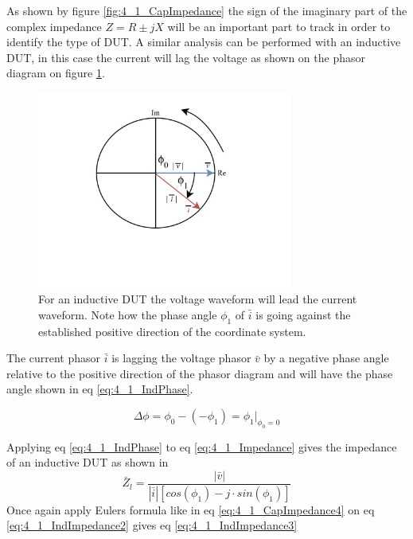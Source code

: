 As shown by figure \ref{fig:4_1_CapImpedance} the sign of the imaginary part of the complex impedance $Z = R \pm jX$ will be an important part to track in order to identify the type of DUT. A similar analysis can be performed with an inductive DUT, in this case the current will lag the voltage as shown on the phasor diagram on figure \ref{fig:4_1_IndPhasor}.
\begin{figure}[H]
    \centering
    \includegraphics[clip, trim=0 175 0 0, width=0.75\textwidth]{Sections/4_TechnicalAnalysis/Figures/4_1_InductivePhasor.pdf}
    \caption{For an inductive DUT the voltage waveform will lead the current waveform. Note how the phase angle $\phi_1$ of $\bar i$ is going against the established positive direction of the coordinate system.}
    \label{fig:4_1_IndPhasor}
\end{figure}

The current phasor $\bar i$ is lagging the voltage phasor $\bar v$ by a negative phase angle relative to the positive direction of the phasor diagram and will have the phase angle shown in eq \ref{eq:4_1_IndPhase}.

\begin{equation}\label{eq:4_1_IndPhase}
    \Delta \phi = \phi_0 -(-\phi_1) =\phi_1 \bigg\rvert_{\phi_0 = 0}
\end{equation}

Applying eq \ref{eq:4_1_IndPhase} to eq \ref{eq:4_1_Impedance} gives the impedance of an inductive DUT as shown in 
\begin{equation}\label{eq:4_1_IndImpedance2}
    \bar Z_l = \frac{|\bar v|}{|\bar i| [cos(\phi_1) -j\cdot sin(\phi_1)]}
\end{equation}
Once again apply Eulers formula like in eq \ref{eq:4_1_CapImpedance4} on eq \ref{eq:4_1_IndImpedance2} gives eq \ref{eq:4_1_IndImpedance3}


